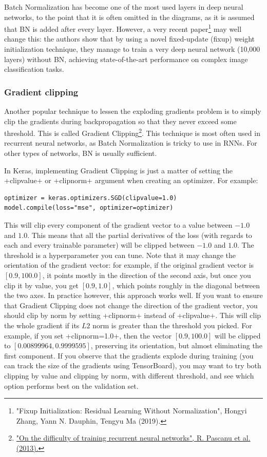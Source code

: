 Batch Normalization has become one of the most used layers in deep neural networks, to the point that it is often omitted in the diagrams, as it is assumed that BN is added after every layer. However, a very recent paper\footnote{"Fixup Initialization: Residual Learning Without Normalization", Hongyi Zhang, Yann N. Dauphin, Tengyu Ma (2019).} may well change this: the authors show that by using a novel fixed-update (fixup) weight initialization technique, they manage to train a very deep neural network (10,000 layers) without BN, achieving state-of-the-art performance on complex image classification tasks.

\subsubsection{Gradient clipping}
Another popular technique to lessen the exploding gradients problem is to simply clip the gradients during backpropagation so that they never exceed some threshold. This is called Gradient Clipping\footnote{\href{https://homl.info/52}{"On the difficulty of training recurrent neural networks", R. Pascanu et al. (2013).}}. This technique is most often used in recurrent neural networks, as Batch Normalization is tricky to use in RNNs. For other types of networks, BN is usually sufficient.

In Keras, implementing Gradient Clipping is just a matter of setting the \cd+clipvalue+ or \cd+clipnorm+ argument when creating an optimizer. For example:
\begin{lstlisting}
optimizer = keras.optimizers.SGD(clipvalue=1.0)
model.compile(loss="mse", optimizer=optimizer)
\end{lstlisting}
This will clip every component of the gradient vector to a value between $-1.0$ and $1.0$. This means that all the partial derivatives of the loss (with regards to each and every trainable parameter) will be clipped between $-1.0$ and $1.0$. The threshold is a hyperparameter you can tune. Note that it may change the orientation of the gradient vector: for example, if the original gradient vector is $[0.9, 100.0]$, it points mostly in the direction of the second axis, but once you clip it by value, you get $[0.9, 1.0]$, which points roughly in the diagonal between the two axes. In practice however, this approach works well. If you want to ensure that Gradient Clipping does not change the direction of the gradient vector, you should clip by norm by setting \cd+clipnorm+ instead of \cd+clipvalue+. This will clip the whole gradient if its $L2$ norm is greater than the threshold you picked. For example, if you set \cd+clipnorm=1.0+, then the vector $[0.9, 100.0]$ will be clipped to $[0.00899964, 0.9999595]$, preserving its orientation, but almost eliminating the first component. If you observe that the gradients explode during training (you can track the size of the gradients using TensorBoard), you may want to try both clipping by value and clipping by norm, with different threshold, and see which option performs best on the validation set.

